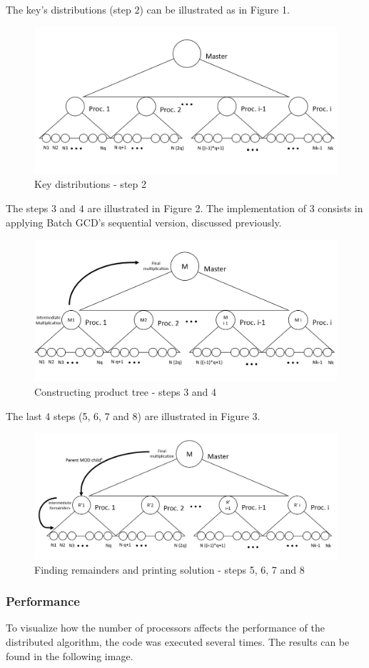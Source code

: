 \documentclass[a4paper,12pt]{article}
\begin{document}
The key's distributions (step $2$) can be illustrated as in Figure 1.

	\begin{figure}[H]
		\centering
		\includegraphics[width=0.65\linewidth]{figure5.png}
		 \caption{Key distributions - step 2}
	\end{figure}

The steps $3$ and $4$ are illustrated in Figure 2. The implementation of $3$ consists in applying Batch GCD's sequential version, discussed previously.

	\begin{figure}[H]
		\centering
		\includegraphics[width=0.65\linewidth]{figure6.png}
		\caption{Constructing product tree - steps 3 and 4}
	\end{figure}

The last 4 steps (5, 6, 7 and 8) are illustrated in Figure 3. 

	\begin{figure}[H]
		\centering
		\includegraphics[width=0.65\linewidth]{figure7.png}
		\caption{Finding remainders and printing solution - steps 5, 6, 7 and 8}
	\end{figure}


\subsubsection{Performance}
To visualize how the number of processors affects the performance of the distributed algorithm, the code was executed several times. The results can be found in the following image.
\end{document}

